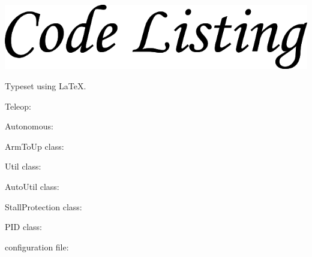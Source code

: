\documentclass[letterpaper,10pt]{article}
\newcommand{\latex}{\LaTeX}
\begin{document}
\begin{flushleft}

\includegraphics[scale=0.25]{./CodeListingCorsiva.png}

\medskip

Typeset using \latex.

\medskip

Teleop:



\pagebreak

Autonomous:



\pagebreak

ArmToUp class:



\pagebreak

Util class:



\pagebreak

AutoUtil class:



\pagebreak

StallProtection class:



\pagebreak

PID class:



\pagebreak

configuration file:



\end{flushleft}
\end{document}
